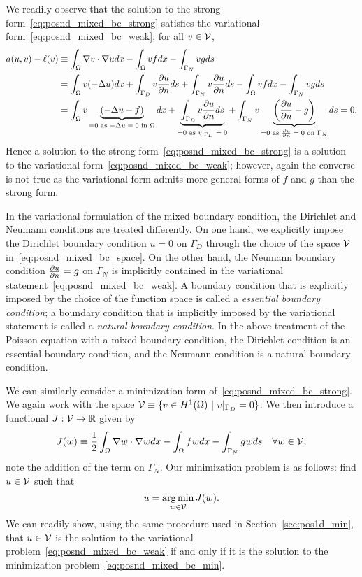 We readily observe that the solution to the strong form~\eqref{eq:posnd_mixed_bc_strong} satisfies the variational form~\eqref{eq:posnd_mixed_bc_weak};  for all $v \in \mathcal{V}$,
\begin{align*}
  a(u,v) - \ell(v)
  &\equiv \int_\Omega \nabla v \cdot \nabla u dx - \int_\Omega vf dx - \int_{\Gamma_N} vg ds
  \\
  &= \int_\Omega v (-\Delta u) dx + \int_{\Gamma_D} v \frac{\partial u}{\partial n} ds + \int_{\Gamma_N} v \frac{\partial u}{\partial n} ds  - \int_\Omega vf dx - \int_{\Gamma_N} vg ds
  \\
  &= \int_\Omega v \underbrace{ (-\Delta u - f) }_{= 0 \text{ as $-\Delta u=  0$ in $\Omega$}} dx
  + \underbrace{ \int_{\Gamma_D} v \frac{\partial u}{\partial n} ds }_{= 0 \text{ as $v|_{\Gamma_D} = 0$}}
  + \int_{\Gamma_N} v \underbrace{ \left( \frac{\partial u}{\partial n} - g \right) }_{= 0 \text{ as $\frac{\partial u}{\partial n} = 0$ on $\Gamma_N$}}ds = 0.
\end{align*}
Hence a solution to the strong form~\eqref{eq:posnd_mixed_bc_strong} is a solution to the variational form~\eqref{eq:posnd_mixed_bc_weak}; however, again the converse is not true as the variational form admits more general forms of $f$ and $g$ than the strong form.

In the variational formulation of the mixed boundary condition, the Dirichlet and Neumann conditions are treated differently.  On one hand, we explicitly impose the Dirichlet boundary condition $u = 0$ on $\Gamma_D$ through the choice of the space $\mathcal{V}$ in~\eqref{eq:posnd_mixed_bc_space}. On the other hand, the Neumann boundary condition $\frac{\partial u}{\partial n} = g$ on $\Gamma_N$ is implicitly contained in the variational statement~\eqref{eq:posnd_mixed_bc_weak}.  A boundary condition that is explicitly imposed by the choice of the function space is called a \emph{essential boundary condition}; a boundary condition that is implicitly imposed by the variational statement is called a \emph{natural boundary condition}.  In the above treatment of the Poisson equation with a mixed boundary condition, the Dirichlet condition is an essential boundary condition, and the Neumann condition is a natural boundary condition.



We can similarly consider a minimization form of~\eqref{eq:posnd_mixed_bc_strong}.  We again work with the space $\mathcal{V} \equiv \{ v \in H^1(\Omega) \ | \ v|_{\Gamma_D} = 0 \}$.  We then introduce a functional $J: \mathcal{V} \to \mathbb{R}$ given by
\begin{equation}
  J(w) \equiv \frac{1}{2} \int_\Omega \nabla w \cdot \nabla w dx - \int_\Omega f w dx - \int_{\Gamma_N} g w ds \quad \forall w \in \mathcal{V};
  \label{eq:posnd_mixed_bc_min_func}
\end{equation}
note the addition of the term on $\Gamma_N$.
Our minimization problem is as follows: find $u \in \mathcal{V}$ such that
\begin{equation}
  u = \operatorname*{arg\,min}_{w \in \mathcal{V}} J(w). \label{eq:posnd_mixed_bc_min}
\end{equation}
We can readily show, using the same procedure used in Section~\ref{sec:pos1d_min}, that $u \in \mathcal{V}$ is the solution to the variational problem~\eqref{eq:posnd_mixed_bc_weak} if and only if it is the solution to the minimization problem~\eqref{eq:posnd_mixed_bc_min}.

